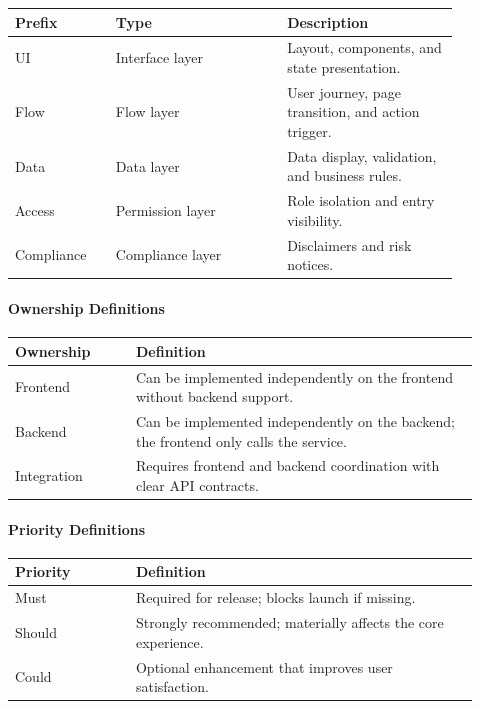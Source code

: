 \begingroup
\small
\begin{longtable}{L{0.20\linewidth}L{0.34\linewidth}L{0.34\linewidth}}
\toprule
\textbf{Prefix} & \textbf{Type} & \textbf{Description} \\
\midrule
UI & Interface layer & Layout, components, and state presentation. \\
Flow & Flow layer & User journey, page transition, and action trigger. \\
Data & Data layer & Data display, validation, and business rules. \\
Access & Permission layer & Role isolation and entry visibility. \\
Compliance & Compliance layer & Disclaimers and risk notices. \\
\bottomrule
\end{longtable}
\endgroup

\paragraph{Ownership Definitions}

\begingroup
\small
\begin{longtable}{L{0.24\linewidth}L{0.68\linewidth}}
\toprule
\textbf{Ownership} & \textbf{Definition} \\
\midrule
Frontend & Can be implemented independently on the frontend without backend support. \\
Backend & Can be implemented independently on the backend; the frontend only calls the service. \\
Integration & Requires frontend and backend coordination with clear API contracts. \\
\bottomrule
\end{longtable}
\endgroup

\paragraph{Priority Definitions}

\begingroup
\small
\begin{longtable}{L{0.24\linewidth}L{0.68\linewidth}}
\toprule
\textbf{Priority} & \textbf{Definition} \\
\midrule
Must & Required for release; blocks launch if missing. \\
Should & Strongly recommended; materially affects the core experience. \\
Could & Optional enhancement that improves user satisfaction. \\
\bottomrule
\end{longtable}
\endgroup

